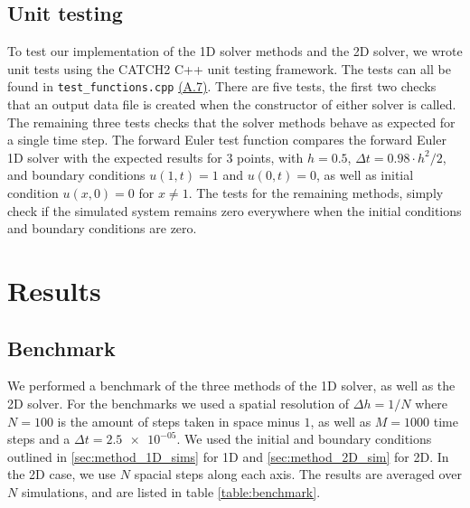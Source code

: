 \documentclass[reprint,english,notitlepage]{revtex4-1}  %
\begin{document}
\subsection{Unit testing} \label{sec:method_unit_testing}

To test our implementation of the 1D solver methods and the 2D solver, we wrote unit tests using the CATCH2 C++ unit testing framework. The tests can all be found in \verb+test_functions.cpp+ \hyperref[A.7]{(A.7)}. There are five tests, the first two checks that an output data file is created when the constructor of either solver is called. The remaining three tests checks that the solver methods behave as expected for a single time step. The forward Euler test function compares the forward Euler 1D solver with the expected results for \(3\) points, with \(h=0.5\), \(\Delta t = 0.98\cdot h^{2}/2\), and boundary conditions \(u(1, t) = 1\) and \(u(0, t) = 0\), as well as initial condition \(u(x, 0) = 0\) for \(x \neq 1\). The tests for the remaining methods, simply check if the simulated system remains zero everywhere when the initial conditions and boundary conditions are zero.







 
\clearpage

\section{Results} \label{sec:results}

\subsection{Benchmark} \label{sec:results_benchmark}
We performed a benchmark of the three methods of the 1D solver, as well as the 2D solver. For the benchmarks we used a spatial resolution of \(\Delta h = 1/N\) where \(N = 100\) is the amount of steps taken in space minus \(1\), as well as \(M = 1000\) time steps and a \(\Delta t = \num{2.5e-05}\). We used the initial and boundary conditions outlined in \ref{sec:method_1D_sims} for 1D and \ref{sec:method_2D_sim} for 2D. In the 2D case, we use \(N\) spacial steps along each axis. The results are averaged over \(N\) simulations, and are listed in table \ref{table:benchmark}.
\end{document}
